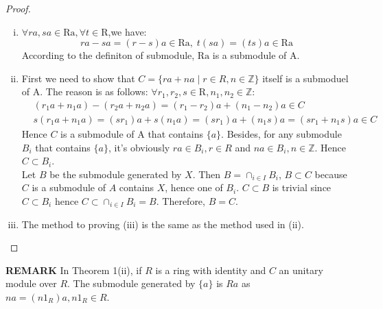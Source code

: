 \documentclass[a4paper]{article}
\newcommand{\Z}{\mathbb{Z}}
\begin{document}
    \begin{proof}
        \begin{enumerate}[(i)]
            \item $\forall ra,sa\in \mathrm{Ra},\forall t\in\mathrm{R}$,we have:
            $$
            ra-sa=(r-s)a\in \mathrm{Ra},\;t(sa)=(ts)a\in \mathrm{Ra}
            $$
            According to the definiton of submodule, $\mathrm{Ra}$ is a submodule of A.
            \item First we need to show that $C=\{ra+na\;|\;r\in R, n\in \Z\}$ itself is a submoduel of A. The reason is as follows: $\forall r_1,r_2,s\in \mathrm{R},n_1,n_2\in \Z$:
            $$
            \begin{aligned}
            &(r_1a+n_1a)-(r_2a+n_2a)=(r_1-r_2)a+(n_1-n_2)a\in C\\
            &s(r_1a+n_1a)=(sr_1)a+s(n_1a)=(sr_1)a+(n_1s)a=(sr_1+n_1s)a\in C
            \end{aligned}
            $$ 
            Hence $C$ is a submodule of $\mathrm{A}$ that contains $\{a\}$. Besides, for any submodule $B_i$ that contains $\{a\}$, it's obviously $ra\in B_i,r\in R$ and $na\in B_i,n\in \Z$. Hence $C\subset B_i$.\\
            Let $B$ be the submodule generated by $X$. Then $B=\cap_{i\in I}B_i$, $B\subset C$ because $C$ is a submodule of $A$ contains $X$, hence one of $B_i$. $C\subset B$ is trivial since $C\subset B_i$ hence $C\subset \cap_{i\in I} B_i=B$. Therefore, $B=C$. 
            
            \item The method to proving (iii) is the same as the method used in (ii).
        \end{enumerate}
    \end{proof}
    \noindent
    \textbf{REMARK} In Theorem 1(ii), if $R$ is a ring with identity and $C$ an unitary module over $R$. The submodule generated by $\{a\}$ is $Ra$ as $na=(n1_R)a,n1_R\in R$.
\end{document}
